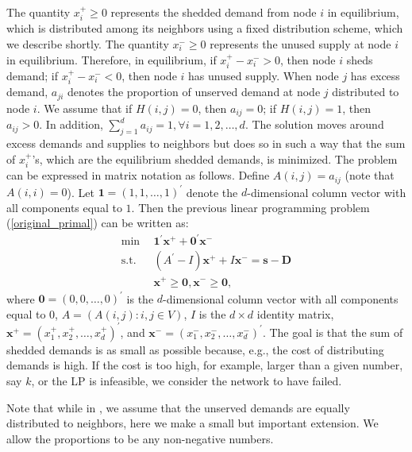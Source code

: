 \documentclass[final,11pt,3p]{article}\usepackage{setspace}
\begin{document}
The quantity $x_{i}^{+} \ge0$ represents the shedded demand from node $i$ in
equilibrium, which is distributed among its neighbors using a fixed
distribution scheme, which we describe shortly. The quantity $x_{i}^{-} \ge0$
represents the unused supply at node $i$ in equilibrium. Therefore, in
equilibrium, if $x_{i}^{+} - x_{i}^{-} > 0$, then node $i$ sheds demand; if
$x_{i}^{+} - x_{i}^{-} < 0$, then node $i$ has unused supply. When node $j$
has excess demand, $a_{ji}$ denotes the proportion of unserved demand at node
$j$ distributed to node $i$. We assume that if $H(i,j) = 0$, then $a_{ij} =
0$; if $H(i,j) = 1$, then $a_{ij} > 0$. In addition, $\sum_{j = 1}^{d} a_{ij}
= 1, \forall i = 1,2,\dots, d$. The solution moves around excess demands and
supplies to neighbors but does so in such a way that the sum of $x_{i}^{+}$'s,
which are the equilibrium shedded demands, is minimized. The problem can be
expressed in matrix notation as follows. Define $A(i,j)=a_{ij}$ (note that
$A(i,i) = 0$). Let $\boldsymbol{1} = (1,1,\dots,1)^{\prime}$ denote the
$d$-dimensional column vector with all components equal to $1$. Then the
previous linear programming problem (\ref{original_primal}) can be written as:
\begin{align}
\label{primal}\min~~  & \boldsymbol{1}^{\prime}\boldsymbol{x}^{+} +
\boldsymbol{0}^{\prime}\boldsymbol{x}^{-}\nonumber\\
\text{s.t.}~~ &  (A^{\prime}- I) \boldsymbol{x}^{+} + I \boldsymbol{x}^{-} =
\boldsymbol{s}-\boldsymbol{D}\nonumber\\
&  \boldsymbol{x}^{+} \ge\boldsymbol{0}, \boldsymbol{x}^{-} \ge\boldsymbol{0},
\end{align}
where $\boldsymbol{0} = (0,0,\dots,0)^{\prime}$ is the $d$-dimensional column
vector with all components equal to $0$, $A = (A(i,j): i,j \in V)$, $I$ is the
$d \times d$ identity matrix, $\boldsymbol{x}^{+} = (x_{1}^{+},x_{2}^{+},\dots,x_{d}^{+})^{\prime}$, and $\boldsymbol{x}^{-} = (x_{1}^{-},x_{2}^{-},\dots,x_{d}^{-})^{\prime}$. The goal is that the sum of shedded demands
is as small as possible because, e.g., the cost of distributing demands is
high. If the cost is too high, for example, larger than a given number, say
$k$, or the LP is infeasible, we consider the network to have failed.

Note that while in \cite{bln}, we assume that the unserved demands are equally distributed to neighbors, here we make a small but important extension. We allow the proportions to be any non-negative numbers.
\end{document}
